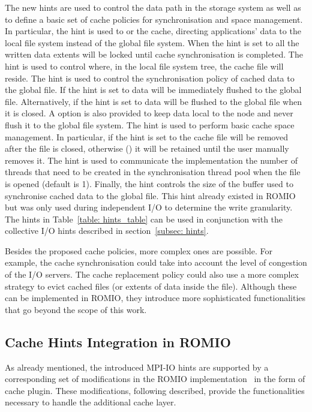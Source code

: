 The new hints are used to control the data path in the storage system as well as to define a basic set of cache policies for synchronisation and space management. In particular, the  hint is used to  or 
 the cache, directing applications' data to the local file system instead of the global file system. When the hint is set to  all the written data extents will be locked until cache synchronisation is completed. 
The  hint is used to control where, in the local file system tree, the cache file will reside. The  hint is used to control the synchronisation policy of cached data to the global file. 
If the hint is set to  data will be immediately flushed to the global file. Alternatively, if the hint is set to  data will be flushed to the global file when it is closed. A  
option is also provided to keep data local to the node and never flush it to the global file system. The  hint is used to perform basic cache space management. In particular, if the hint is set to  
the cache file will be removed after the file is closed, otherwise () it will be retained until the user manually removes it. The  hint is used to communicate the implementation the number of threads 
that need to be created in the synchronisation thread pool when the file is opened (default is 1). Finally, the  hint controls the size of the buffer used to synchronise cached data to the global file. This hint already 
existed in ROMIO but was only used during independent I/O to determine the write granularity. The hints in Table~\ref{table: hints_table} can be used in conjunction with the collective I/O hints described in section~\ref{subsec: hints}.

Besides the proposed cache policies, more complex ones are possible. For example, the cache synchronisation could take into account the level of congestion of the I/O servers. The cache replacement policy could also use a more complex strategy to 
evict cached files (or extents of data inside the file). Although these can be implemented in ROMIO, they introduce more sophisticated functionalities that go beyond the scope of this work.

\subsection{Cache Hints Integration in ROMIO}
\label{subsec: support}
As already mentioned, the introduced MPI-IO hints are supported by a corresponding set of modifications in the ROMIO implementation~\cite{E10-DEEPER} in the form of cache plugin. These modifications, following described, provide the functionalities 
necessary to handle the additional cache layer.

